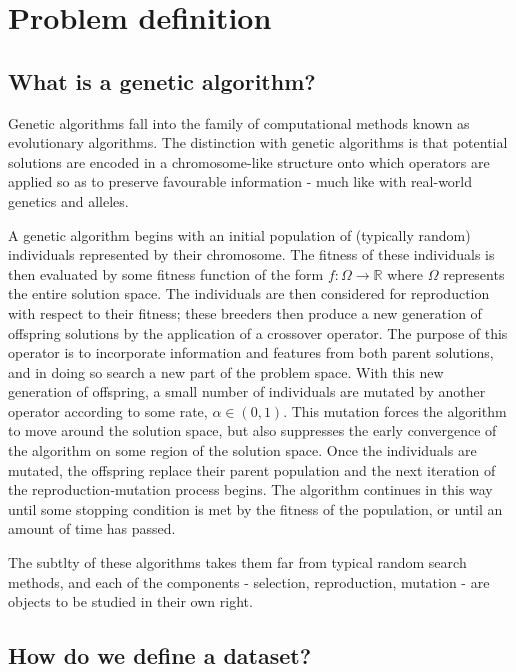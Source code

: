 \section{Problem definition}\label{sec:definition}

\subsection{What is a genetic algorithm?}\label{subsec:genetic_algorithm}

Genetic algorithms fall into the family of computational methods known as
evolutionary algorithms. The distinction with genetic algorithms is that
potential solutions are encoded in a chromosome-like structure onto which
operators are applied so as to preserve favourable information \-- much like
with real-world genetics and alleles.

A genetic algorithm begins with an initial population of (typically random)
individuals represented by their chromosome. The fitness of these individuals
is then evaluated by some fitness function of the form \(f : \Omega \to
\mathbb{R}\) where \(\Omega\) represents the entire solution space. The
individuals are then considered for reproduction with respect to their fitness;
these breeders then produce a new generation of offspring solutions by the
application of a crossover operator. The purpose of this operator is to
incorporate information and features from both parent solutions, and in doing so
search a new part of the problem space. With this new generation of offspring, a
small number of individuals are mutated by another operator according to some
rate, \(\alpha \in (0, 1)\). This mutation forces the algorithm to move around
the solution space, but also suppresses the early convergence of the algorithm
on some region of the solution space. Once the individuals are mutated, the
offspring replace their parent population and the next iteration of the
reproduction-mutation process begins. The algorithm continues in this way until
some stopping condition is met by the fitness of the population, or until an
amount of time has passed.

The subtlty of these algorithms takes them far from typical random search
methods, and each of the components \-- selection, reproduction, mutation \--
are objects to be studied in their own right.



\subsection{How do we define a dataset?}\label{subsec:dataset}
